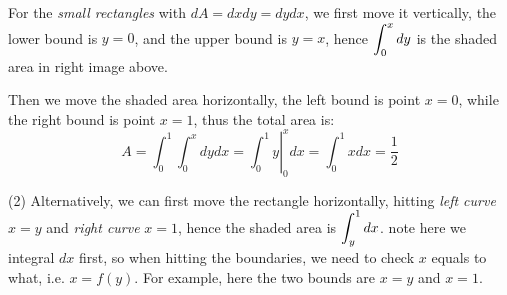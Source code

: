\begin{spacing}{1.3}
    For the {\it small rectangles} with $dA=dxdy=dydx$, we first move it vertically,
    the lower bound is $y=0$, and the upper bound is $y=x$, hence $\disp \int_0^x dy$
    is the shaded area in right image above.

    Then we move the shaded area horizontally, the left bound is point $x=0$, while 
    the right bound is point $x=1$, thus the total area is: 
    $$A=\int_0^1 \int_0^x dydx=\left. \int_0^1 y \right\vert_0^x dx=\int_0^1 xdx=\frac{1}{2}$$

    (2) Alternatively, we can first move the rectangle horizontally, hitting 
    {\it left curve} $x=y$ and {\it right curve} $x=1$, hence the shaded area is 
    $\disp \int_y^1 dx$. {\red note here we integral $dx$ first, so when hitting 
    the boundaries, we need to check $x$ equals to what, i.e. $x=f(y)$.}
    For example, here the two bounds are $x=y$ and $x=1$.
    \begin{center}
        \begin{tikzpicture}[x=0.75pt,y=0.75pt,yscale=-1,xscale=1]


\end{tikzpicture}
\end{center}
\end{spacing}
